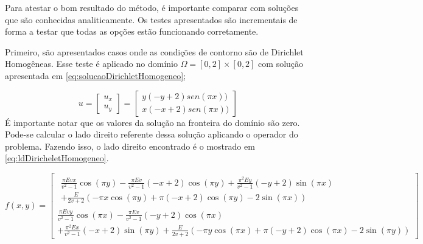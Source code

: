 Para atestar o bom resultado do método, é importante comparar com soluções que são conhecidas analiticamente. Os testes apresentados são incrementais de forma a testar que todas as opções estão funcionando corretamente.

Primeiro, são apresentados casos onde as condições de contorno são de Dirichlet Homogêneas. Esse teste é aplicado no domínio $ \Omega = [0, 2] \times [0, 2]$ com solução apresentada em \ref{eq:solucaoDirichletHomogeneo};

\begin{equation}\label{eq:solucaoDirichletHomogeneo}
u = 
\begin{bmatrix}
u_x
\\ 
u_y
\end{bmatrix}
=
\begin{bmatrix}
y(-y+2)sen(\pi x))
\\ 
x(-x+2)sen(\pi x))
\end{bmatrix}
\end{equation}É importante notar que os valores da solução na fronteira do domínio são zero. Pode-se calcular o lado direito referente dessa solução aplicando o operador do problema. Fazendo isso, o lado direito encontrado é o mostrado em \ref{eq:ldDiricheletHomogeneo}.

\begin{equation}\label{eq:ldDiricheletHomogeneo}
f(x, y) = 
\left[\begin{matrix}
\begin{split}
\frac{\pi E v x}{v^{2} - 1} \cos{\left (\pi y \right )} - \frac{\pi E v}{v^{2} - 1} \left(- x + 2\right) \cos{\left (\pi y \right )} + \frac{\pi^{2} E y}{v^{2} - 1} \left(- y + 2\right) \sin{\left (\pi x \right )} 
\\
+
\frac{E}{2 v + 2} \left(- \pi x \cos{\left (\pi y \right )} + \pi \left(- x + 2\right) \cos{\left (\pi y \right )} - 2 \sin{\left (\pi x \right )}\right)
\end{split}
\\

\frac{\pi E v y}{v^{2} - 1} \cos{\left (\pi x \right )} - \frac{\pi E v}{v^{2} - 1} \left(- y + 2\right) \cos{\left (\pi x \right )} 
\\
+ \frac{\pi^{2} E x}{v^{2} - 1} \left(- x + 2\right) \sin{\left (\pi y \right )} + \frac{E}{2 v + 2} \left(- \pi y \cos{\left (\pi x \right )} + \pi \left(- y + 2\right) \cos{\left (\pi x \right )} - 2 \sin{\left (\pi y \right )}\right)\end{matrix}\right]
\end{equation}


